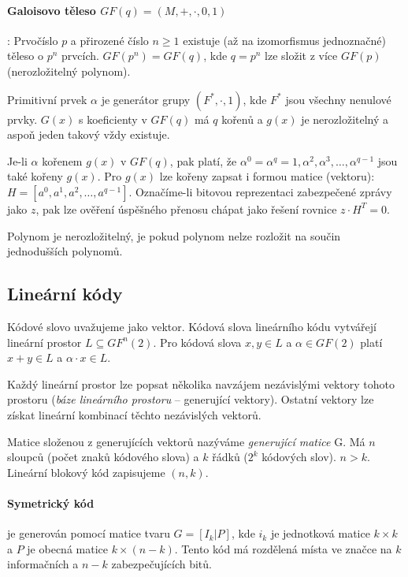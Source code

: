 \documentclass[a4paper, 11pt]{report}
\begin{document}
\paragraph{Galoisovo těleso $GF(q) = (M, +, \cdot, 0, 1)$}: Prvočíslo $p$ a přirozené číslo $n \geq 1$ existuje (až na izomorfismus jednoznačné) těleso o $p^n$ prvcích. $GF(p^n) = GF(q)$, kde $q = p^n$ lze složit z více $GF(p)$ (nerozložitelný polynom).

Primitivní prvek $\alpha$ je generátor grupy $(F^*, \cdot, 1)$, kde $F^*$ jsou všechny nenulové prvky. $G(x)$ s koeficienty v $GF(q)$ má $q$ kořenů a $g(x)$ je nerozložitelný a aspoň jeden takový vždy existuje.

Je-li $\alpha$ kořenem $g(x)$ v $GF(q)$, pak platí, že $\alpha^0 = \alpha^q = 1, \alpha^2, \alpha^3, \dots, \alpha^{q-1}$ jsou také kořeny $g(x)$. Pro $g(x)$ lze kořeny zapsat i formou matice (vektoru): $H = [a^0, a^1, a^2, \dots, a^{q-1}]$. Označíme-li bitovou reprezentaci zabezpečené zprávy jako $z$, pak lze ověření úspěšného přenosu chápat jako řešení rovnice $z \cdot H^T = 0$.

Polynom je nerozložitelný, je pokud polynom nelze rozložit na součin jednodušších polynomů.

\subsection{Lineární kódy}
Kódové slovo uvažujeme jako vektor. Kódová slova lineárního kódu vytvářejí lineární prostor $L \subseteq GF^n(2)$. Pro kódová slova $x, y \in L$ a $\alpha \in GF(2)$ platí $x+y \in L$ a $\alpha \cdot x \in L$.

Každý lineární prostor lze popsat několika navzájem nezávislými vektory tohoto prostoru (\emph{báze lineárního prostoru} -- generující vektory). Ostatní vektory lze získat lineární kombinací těchto nezávislých vektorů.

Matice složenou z generujících vektorů nazýváme \emph{generující matice} G. Má $n$ sloupců (počet znaků kódového slova) a $k$ řádků ($2^k$ kódových slov). $n > k$. Lineární blokový kód zapisujeme $(n, k)$.

\paragraph{Symetrický kód} je generován pomocí matice tvaru $G = [I_k|P]$, kde $i_k$ je jednotková matice $k \times k$ a $P$ je obecná matice $k \times (n-k)$. Tento kód má rozdělená místa ve značce na $k$ informačních a $n-k$ zabezpečujících bitů.
\end{document}
